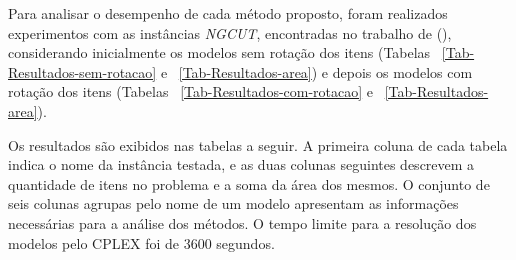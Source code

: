 \documentclass[10pt, a4paper]{article}
\begin{document}
        Para analisar o desempenho de cada método proposto, foram realizados experimentos com as instâncias \emph{NGCUT}, encontradas no trabalho de (\cite{Martello2003}), considerando inicialmente os modelos sem rotação dos itens (Tabelas ~\ref{Tab-Resultados-sem-rotacao} e ~\ref{Tab-Resultados-area}) e depois os modelos com rotação dos itens (Tabelas ~\ref{Tab-Resultados-com-rotacao} e ~\ref{Tab-Resultados-area}).
    
        Os resultados são exibidos nas tabelas a seguir. A primeira coluna de cada tabela indica o nome da instância testada, e as duas colunas seguintes descrevem a quantidade de itens no problema e a soma da área dos mesmos. O conjunto de seis colunas agrupas pelo nome de um modelo apresentam as informações necessárias para a análise dos métodos. O tempo limite para a resolução dos modelos pelo CPLEX foi de 3600 segundos.
\end{document}
